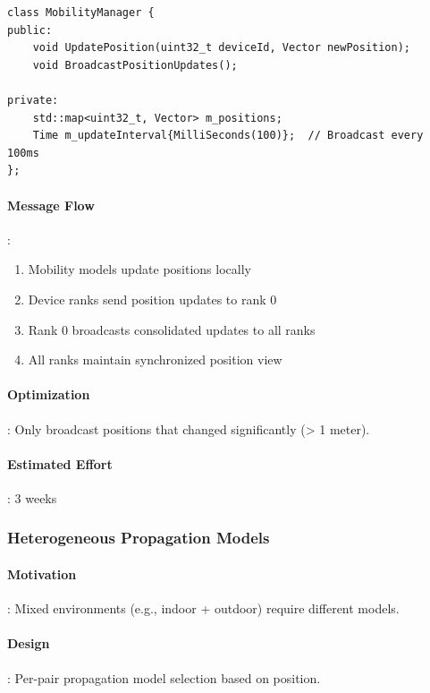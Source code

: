 \begin{lstlisting}[style=cpp]
class MobilityManager {
public:
    void UpdatePosition(uint32_t deviceId, Vector newPosition);
    void BroadcastPositionUpdates();
    
private:
    std::map<uint32_t, Vector> m_positions;
    Time m_updateInterval{MilliSeconds(100)};  // Broadcast every 100ms
};
\end{lstlisting}

\paragraph{Message Flow}:
\begin{enumerate}
    \item Mobility models update positions locally
    \item Device ranks send position updates to rank 0
    \item Rank 0 broadcasts consolidated updates to all ranks
    \item All ranks maintain synchronized position view
\end{enumerate}

\paragraph{Optimization}:
Only broadcast positions that changed significantly (> 1 meter).

\paragraph{Estimated Effort}: 3 weeks

\subsubsection{Heterogeneous Propagation Models}

\paragraph{Motivation}:
Mixed environments (e.g., indoor + outdoor) require different models.

\paragraph{Design}:
Per-pair propagation model selection based on position.

